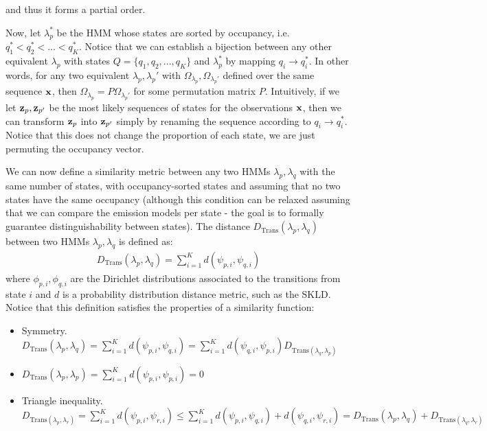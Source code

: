 \documentclass[../main.tex]{subfiles}
\begin{document}
and thus it forms a partial order.
\par Now, let $\lambda_p^\text{*}$ be the HMM whose states are sorted by occupancy, i.e. $q_1^\text{*} < q_2^\text{*} < ... < q_K^\text{*}$. Notice that we can establish a bijection between any other equivalent $\lambda_p$ with states $Q = \{q_1, q_2, ..., q_K\}$ and $\lambda_p^\text{*}$ by mapping $q_i \rightarrow q_i^\text{*}$. In other words, for any two equivalent $\lambda_p, \lambda_p'$ with $\Omega_{\lambda_p}, \Omega_{\lambda_p'}$ defined over the same sequence $\mathbf{x}$, then $\Omega_{\lambda_p} = P\Omega_{\lambda_p'}$ for some permutation matrix $P$. Intuitively, if we let $\mathbf{z}_p, \mathbf{z}_{p'}$ be the most likely sequences of states for the observations $\mathbf{x}$, then we can transform $\mathbf{z}_p$ into $\mathbf{z}_{p'}$ simply by renaming the sequence according to $q_i \rightarrow q_i^\text{*}$. Notice that this does not change the proportion of each state, we are just permuting the occupancy vector.
\par We can now define a similarity metric between any two HMMs $\lambda_p, \lambda_q$ with the same number of states, with occupancy-sorted states and assuming that no two states have the same occupancy (although this condition can be relaxed assuming that we can compare the emission models per state - the goal is to formally guarantee distinguishability between states). The distance $D_{\text{Trans}}(\lambda_p, \lambda_q)$ between two HMMs $\lambda_p, \lambda_q$ is defined as:
\begin{align*}
D_{\text{Trans}}(\lambda_p, \lambda_q) = \sum_{i=1}^K d(\psi_{p, i}, \psi_{q, i})
\end{align*}
where $\phi_{p, i}, \phi_{q, i}$ are the Dirichlet distributions associated to the transitions from state $i$ and $d$ is a probability distribution distance metric, such as the SKLD. Notice that this definition satisfies the properties of a similarity function:
\begin{itemize}
\item Symmetry. $D_{\text{Trans}}(\lambda_p, \lambda_q) = \sum_{i=1}^K d(\psi_{p, i}, \psi_{q, i}) = \sum_{i=1}^K d(\psi_{q, i}, \psi_{p, i}) D_{\text{Trans}(\lambda_q, \lambda_p)}$
\item $D_{\text{Trans}}(\lambda_p, \lambda_p) = \sum_{i=1}^K d(\psi_{p, i}, \psi_{p, i}) = 0$
\item Triangle inequality. $D_{\text{Trans}(\lambda_p, \lambda_r)} = \sum_{i=1}^K d(\psi_{p, i}, \psi_{r, i}) \leq \sum_{i=1}^K d(\psi_{p, i}, \psi_{q, i}) + d(\psi_{q, i}, \psi_{r, i}) = D_{\text{Trans}}(\lambda_p, \lambda_q) + D_{\text{Trans}(\lambda_q, \lambda_r)}$
\end{itemize}
\end{document}
